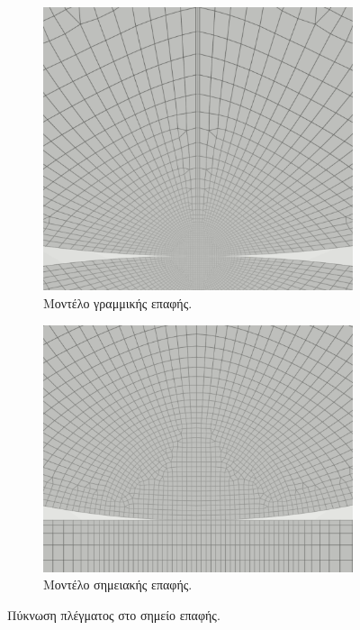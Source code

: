\documentclass{article}
\begin{document}
\begin{figure}[H]
    \centering
    \begin{subfigure}{0.49\linewidth}
        \centering
        \includegraphics[width=0.6\linewidth]{media/lfine2.png}
        \caption{Μοντέλο γραμμικής επαφής.}
    \end{subfigure}
    \hfill
    \begin{subfigure}{0.49\linewidth}
        \centering
        \includegraphics[width=0.7\linewidth]{media/pfine2.png}
        \caption{Μοντέλο σημειακής επαφής.}
    \end{subfigure}
    \caption{Πύκνωση πλέγματος στο σημείο επαφής.}
    \label{fig:mod3}
\end{figure}
\end{document}
